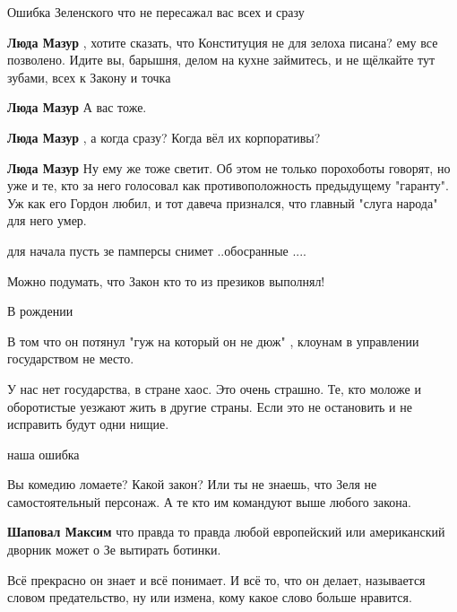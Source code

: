 \begin{itemize}
\begin{itemize}
\end{itemize} %

Ошибка Зеленского что не пересажал вас всех и сразу

\begin{itemize} %
\textbf{Люда Мазур} , хотите сказать, что Конституция не для зелоха писана? ему все позволено. Идите вы, барышня, делом на кухне займитесь, и не щёлкайте тут зубами, всех к Закону и точка

\textbf{Люда Мазур} А вас тоже.


\textbf{Люда Мазур} , а когда сразу? Когда вёл их корпоративы?

\textbf{Люда Мазур} Ну ему же тоже светит. Об этом не только порохоботы говорят, но уже и те, кто за него голосовал как противоположность предыдущему "гаранту". Уж как его Гордон любил, и тот давеча признался, что главный "слуга народа" для него умер.


для начала пусть зе памперсы снимет ..обосранные ....
\end{itemize} %

Можно подумать, что Закон кто то из презиков выполнял!

В рождении

В том что он потянул "гуж на который он не дюж" , клоунам в управлении государством не место.


У нас нет государства, в стране хаос. Это очень страшно. Те, кто моложе и
оборотистые уезжают жить в другие страны. Если это не остановить и не исправить
будут одни нищие.


наша ошибка


Вы комедию ломаете? Какой закон? Или ты не знаешь, что Зеля не самостоятельный
персонаж. А те кто им командуют выше любого закона.

\begin{itemize} %
\textbf{Шаповал Максим} что правда то правда любой европейский или американский дворник может о Зе вытирать ботинки.
\end{itemize} %


Всё прекрасно он знает и всё понимает. И всё то, что он делает, называется
словом предательство, ну или измена, кому какое слово больше нравится.

\end{itemize} %
